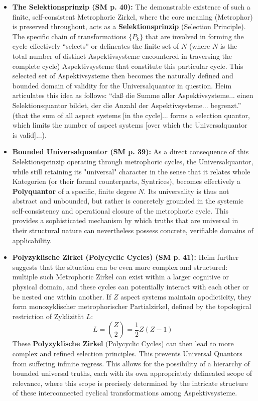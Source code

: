 \documentclass[12pt]{article}
\newcommand{\q}[1]{\enquote{#1}}
\begin{document}
\begin{itemize}
    \item \textbf{The Selektionsprinzip (SM p. 40):}
    The demonstrable existence of such a finite, self-consistent Metrophoric Zirkel, where the core meaning (Metrophor) is preserved throughout, acts as a \textbf{Selektionsprinzip} (Selection Principle). The specific chain of transformations \( \{P_k\} \) that are involved in forming the cycle effectively \q{selects} or delineates the finite set of \( N \) (where \( N \) is the total number of distinct Aspektivsysteme encountered in traversing the complete cycle) Aspektivsysteme that constitute this particular cycle. This selected set of Aspektivsysteme then becomes the naturally defined and bounded domain of validity for the Universalquantor in question. Heim articulates this idea as follows: \q{daß die Summe aller Aspektivsysteme... einen Selektionsquantor bildet, der die Anzahl der Aspektivsysteme... begrenzt.} (that the sum of all aspect systems [in the cycle]... forms a selection quantor, which limits the number of aspect systems [over which the Universalquantor is valid]...).

    \item \textbf{Bounded Universalquantor (SM p. 39):}
    As a direct consequence of this Selektionsprinzip operating through metrophoric cycles, the Universalquantor, while still retaining its "universal" character in the sense that it relates whole Kategorien (or their formal counterparts, Syntrices), becomes effectively a \textbf{Polyquantor} of a specific, finite degree \( N \). Its universality is thus not abstract and unbounded, but rather is concretely grounded in the systemic self-consistency and operational closure of the metrophoric cycle. This provides a sophisticated mechanism by which truths that are universal in their structural nature can nevertheless possess concrete, verifiable domains of applicability.

    \item \textbf{Polyzyklische Zirkel (Polycyclic Cycles) (SM p. 41):}
    Heim further suggests that the situation can be even more complex and structured: multiple such Metrophoric Zirkel can exist within a larger cognitive or physical domain, and these cycles can potentially interact with each other or be nested one within another. If $Z$ aspect systems maintain apodicticity, they form monozyklischer metrophorischer Partialzirkel, defined by the topological restriction of Zyklizität $L$:
    \begin{equation*}
    L = \binom{Z}{2} = \frac{1}{2}Z(Z-1) 
    \end{equation*}
    These \textbf{Polyzyklische Zirkel} (Polycyclic Cycles) can then lead to more complex and refined selection principles. This prevents Universal Quantors from suffering infinite regress. This allows for the possibility of a hierarchy of bounded universal truths, each with its own appropriately delineated scope of relevance, where this scope is precisely determined by the intricate structure of these interconnected cyclical transformations among Aspektivsysteme.
\end{itemize}
\end{document}
